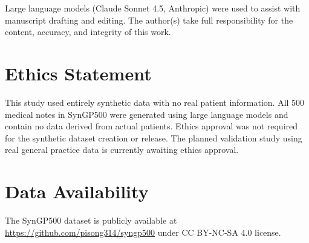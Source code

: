 \documentclass[11pt]{article}
\begin{document}
Large language models (Claude Sonnet 4.5, Anthropic) were used to assist with manuscript drafting and editing. The author(s) take full responsibility for the content, accuracy, and integrity of this work.

\section*{Ethics Statement}

This study used entirely synthetic data with no real patient information. All 500 medical notes in SynGP500 were generated using large language models and contain no data derived from actual patients. Ethics approval was not required for the synthetic dataset creation or release. The planned validation study using real general practice data is currently awaiting ethics approval.

\section*{Data Availability}

The SynGP500 dataset is publicly available at \url{https://github.com/pisong314/syngp500} under CC BY-NC-SA 4.0 license.
\end{document}
